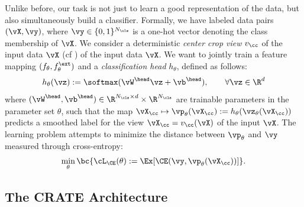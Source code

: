 \documentclass[../../book-main.tex]{subfiles}
\begin{document}
Unlike before, our task is not just to learn a good representation of the data, but also simultaneously build a classifier. Formally, we have labeled data pairs \((\vX, \vy)\), where \(\vy \in \{0, 1\}^{N_{\cls}}\) is a one-hot vector denoting the class membership of \(\vX\). We consider a deterministic \textit{center crop view} \(v_{\cc}\) of the input data \(\vX\) (cf ) of the input data \(\vX\). We want to jointly train a feature mapping \((f_{\theta}, f_{\theta}^{\ext})\) and a \textit{classification head} \(h_{\theta}\), defined as follows:
\begin{equation}
    h_{\theta}(\vz) := \softmax(\vW^{\head}\vz + \vb^{\head}), \qquad  \forall \vz \in \R^{d}
\end{equation}
where \((\vW^{\head}, \vb^{\head}) \in \R^{N_{\cls} \times d} \times \R^{N_{\cls}}\) are trainable parameters in the parameter set \(\theta\), such that the map \(\vX_{\cc} \mapsto \vp_{\theta}(\vX_{\cc}) := h_{\theta}(\vz_{\theta}(\vX_{\cc}))\) predicts a smoothed label for the view \(\vX_{\cc} = v_{\cc}(\vX)\) of the input \(\vX\). The learning problem attempts to minimize the distance between \(\vp_{\theta}\) and \(\vy\) measured through cross-entropy:
\begin{equation}\label{eq:classification_ce_loss}
    \min_{\theta}\bc{\cL_{\CE}(\theta) := \Ex[\CE(\vy, \vp_{\theta}(\vX_{\cc}))]}.
\end{equation}


\subsection{The CRATE Architecture}\label{sub:image_classification_architecture}
\end{document}
